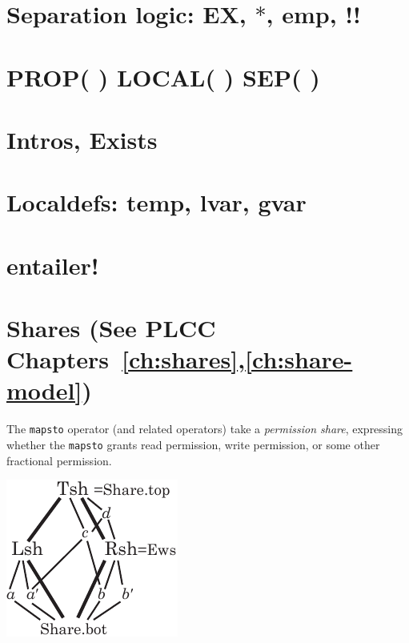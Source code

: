 \documentclass[12pt,fleqn,openany,oneside,showtrims]{memoir}
\newcommand{\ychapter}[2]{\chapter[#1]{#1 \hfill \normalsize #2}}
\begin{document}
\chapter{Separation logic: \upshape \textsf{EX}, $*$, \textsf{emp}, !!}
\label{refcard:separation-logic}

\chapter{\upshape PROP( ) LOCAL( ) SEP( )}
\label{refcard:prop-local-sep}

\chapter{Intros, Exists}
\label{refcard:intros}
\chapter{Localdefs: \upshape \sffamily temp, lvar, gvar}
\label{refcard:localdefs}

\chapter{entailer!}
\label{refcard:entailer}

\ychapter{Shares}{(See PLCC Chapters~\ref{ch:shares},\ref{ch:share-model})}
The \lstinline{mapsto} operator (and related operators) take a
\emph{permission share}, expressing whether
the \lstinline{mapsto} grants read permission, write permission,
or some other fractional permission.

\centerline{\includegraphics[scale=1.25]{graphics/shares.pdf}}
\end{document}
